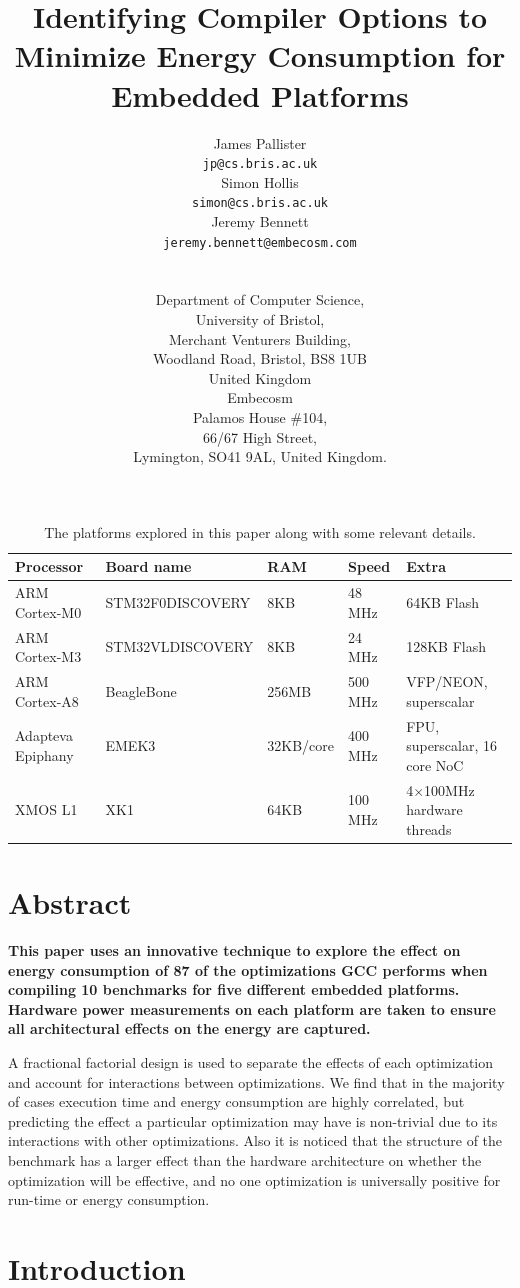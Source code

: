 \documentclass[twocolumn]{article}
\title{\bfseries\fontsize{20}{1}\selectfont Identifying Compiler Options to Minimize Energy Consumption for Embedded Platforms}
\author{
\parbox{0.33\linewidth}{\centering\fontsize{13}{1}\selectfont James Pallister\\[0.5em]\texttt{jp@cs.bris.ac.uk}}
\parbox{0.33\linewidth}{\centering\fontsize{13}{1}\selectfont Simon Hollis\\[0.5em]\texttt{simon@cs.bris.ac.uk}}
\parbox{0.33\linewidth}{\centering\fontsize{13}{1}\selectfont Jeremy Bennett\\[0.5em]\texttt{jeremy.bennett@embecosm.com}} \\[1.5em]
\parbox{0.66\linewidth}{\centering\fontsize{12}{1}\selectfont
Department of Computer Science, \\
University of Bristol, \\
Merchant Venturers Building, \\
Woodland Road, Bristol, BS8 1UB\\
United Kingdom}
\parbox{0.33\linewidth}{\centering\fontsize{13}{1}\selectfont
Embecosm \\
Palamos House \#104, \\
66/67 High Street, \\
Lymington, SO41 9AL, United Kingdom. \\
}
}
\date{}
\let\oldcaption\caption
\renewcommand{\caption}[1]{\oldcaption{\textup{#1}}}
\begin{document}
\maketitle
\begin{table}[!hbt]
	\centering
	\begin{tabular}{l l l l l}
		\textbf{Processor} & \textbf{Board name}  & \textbf{RAM} & \textbf{Speed} & \textbf{Extra} \\
		\hline
		ARM Cortex-M0 	 & STM32F0DISCOVERY		& 8KB		& 48 MHz		  & 64KB Flash\\
		ARM Cortex-M3 	 & STM32VLDISCOVERY		& 8KB		& 24 MHz		  & 128KB Flash\\
		ARM Cortex-A8 	 & BeagleBone			& 256MB		& 500 MHz		  & VFP/NEON, superscalar\\
		Adapteva Epiphany 	 & EMEK3				& 32KB/core & 400 MHz		  & FPU, superscalar, 16 core NoC\\
		XMOS L1 		 & XK1					& 64KB		& 100 MHz 		& 4$\times$100MHz hardware threads \\
	\end{tabular}
	\caption{The platforms explored in this paper along with some relevant details.}
	\label{Table:Platforms}
\end{table}

\section{Abstract}
\raggedbottom
{\bfseries
This paper uses an innovative technique to explore the effect on energy consumption of 87 of the optimizations GCC performs when compiling 10 benchmarks for five different embedded platforms. Hardware power measurements on each platform are taken to ensure all architectural effects on the energy are captured.

A fractional factorial design is used to separate the effects of each optimization and account for interactions between optimizations. We find that in the majority of cases execution time and energy consumption are highly correlated, but predicting the effect a particular optimization may have is non-trivial due to its interactions with other optimizations. Also it is noticed that the structure of the benchmark has a larger effect than the hardware architecture on whether the optimization will be effective, and no one optimization is universally positive for run-time or energy consumption.
}

\section{Introduction}
\end{document}
